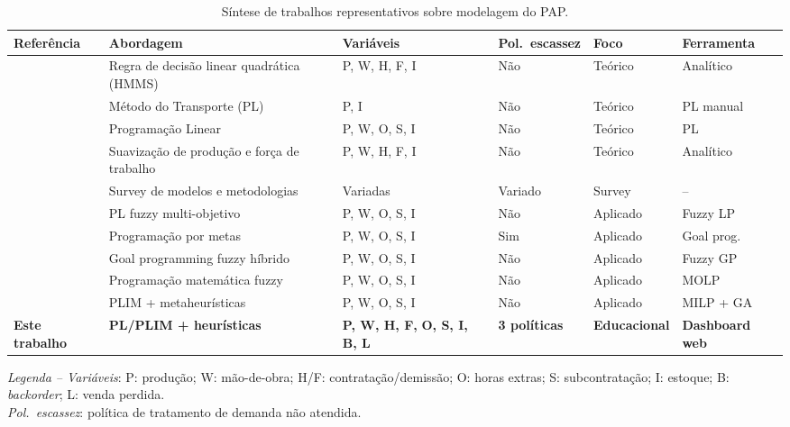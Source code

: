\documentclass[a4paper,11pt]{article}
\begin{document}
\begin{table}[htbp]
\centering
\caption{Síntese de trabalhos representativos sobre modelagem do PAP.}
\label{tab:lit}
\begin{tabularx}{\textwidth}{@{}p{3.1cm}p{3.0cm}p{2.0cm}p{1.4cm}p{1.4cm}X@{}}
\toprule
\textbf{Referência} &
\textbf{Abordagem} &
\textbf{Variáveis} &
\textbf{Pol.\ escassez} &
\textbf{Foco} &
\textbf{Ferramenta} \\
\midrule
\citet{holt1955}       & Regra de decisão linear quadrática (HMMS) & P, W, H, F, I & Não & Teórico & Analítico \\
\citet{bowman1956}     & Método do Transporte (PL) & P, I & Não & Teórico & PL manual \\
\citet{hanssmann1960}  & Programação Linear & P, W, O, S, I & Não & Teórico & PL \\
\citet{silver1967}     & Suavização de produção e força de trabalho & P, W, H, F, I & Não & Teórico & Analítico \\
\citet{nam1992}        & Survey de modelos e metodologias & Variadas & Variado & Survey & -- \\
\citet{wang2004}       & PL fuzzy multi-objetivo & P, W, O, S, I & Não & Aplicado & Fuzzy LP \\
\citet{leung2009}      & Programação por metas & P, W, O, S, I & Sim & Aplicado & Goal prog. \\
\citet{jamalnia2009}   & Goal programming fuzzy híbrido & P, W, O, S, I & Não & Aplicado & Fuzzy GP \\
\citet{baykasoglu2010} & Programação matemática fuzzy & P, W, O, S, I & Não & Aplicado & MOLP \\
\citet{ramezanian2012} & PLIM + metaheurísticas & P, W, O, S, I & Não & Aplicado & MILP + GA \\
\textbf{Este trabalho} & \textbf{PL/PLIM + heurísticas} & \textbf{P, W, H, F,} \textbf{O, S, I, B, L} & \textbf{3 políticas} & \textbf{Educacional} & \textbf{Dashboard web} \\
\bottomrule
\end{tabularx}
\smallskip
\footnotesize
\textit{Legenda -- Variáveis}: P: produção; W: mão-de-obra; H/F: contratação/demissão;
O: horas extras; S: subcontratação; I: estoque; B: \textit{backorder}; L: venda perdida.\\
\textit{Pol.\ escassez}: política de tratamento de demanda não atendida.
\end{table}


\end{document}
